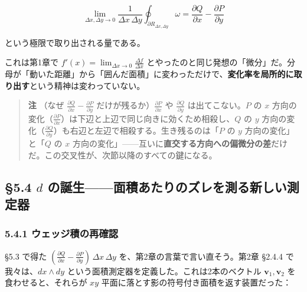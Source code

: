 \documentclass[a4paper,12pt,openany]{book}
\begin{document}
\[\lim_{\Delta x,\Delta y\to 0}\frac{1}{\Delta x\,\Delta y}\oint_{\partial R_{\Delta x,\Delta y}}\omega = \frac{\partial Q}{\partial x} - \frac{\partial P}{\partial y}\]

という極限で取り出される量である。

これは第1章で \(f'(x) = \lim_{\Delta x\to 0} \frac{\Delta f}{\Delta x}\)
とやったのと同じ発想の「微分」だ。分母が「動いた距離」から「囲んだ面積」に変わっただけで、\textbf{変化率を局所的に取り出す}という精神は変わっていない。

\begin{quote}
\textbf{注} （なぜ
\(\frac{\partial Q}{\partial x}-\frac{\partial P}{\partial y}\)
だけが残るか）\(\frac{\partial P}{\partial x}\) や
\(\frac{\partial Q}{\partial y}\) は出てこない。\(P\) の \(x\)
方向の変化（\(\frac{\partial P}{\partial x}\)）は下辺と上辺で同じ向きに効くため相殺し、\(Q\)
の \(y\)
方向の変化（\(\frac{\partial Q}{\partial y}\)）も右辺と左辺で相殺する。生き残るのは「\(P\)
の \(y\) 方向の変化」と「\(Q\) の \(x\)
方向の変化」——互いに\textbf{直交する方向への偏微分の差}だけだ。この交叉性が、次節以降のすべての鍵になる。
\end{quote}

\par\vspace{0.35em}\par

\hypertarget{d-ux306eux8a95ux751fux9762ux7a4dux3042ux305fux308aux306eux30baux30ecux3092ux6e2cux308bux65b0ux3057ux3044ux6e2cux5b9aux5668}{%
\subsection{\texorpdfstring{§5.4 \(d\)
の誕生——面積あたりのズレを測る新しい測定器}{§5.4 d の誕生——面積あたりのズレを測る新しい測定器}}\label{d-ux306eux8a95ux751fux9762ux7a4dux3042ux305fux308aux306eux30baux30ecux3092ux6e2cux308bux65b0ux3057ux3044ux6e2cux5b9aux5668}}

\hypertarget{ux30a6ux30a7ux30c3ux30b8ux7a4dux306eux518dux78baux8a8d}{%
\subsubsection{5.4.1
ウェッジ積の再確認}\label{ux30a6ux30a7ux30c3ux30b8ux7a4dux306eux518dux78baux8a8d}}

§5.3 で得た
\((\frac{\partial Q}{\partial x} - \frac{\partial P}{\partial y})\,\Delta x\,\Delta y\)
を、第2章の言葉で言い直そう。第2章 §2.4.4 で我々は、\(dx \wedge dy\)
という面積測定器を定義した。これは2本のベクトル
\(\mathbf{v}_1, \mathbf{v}_2\) を食わせると、それらが \(xy\)
平面に落とす影の符号付き面積を返す装置だった：
\end{document}
